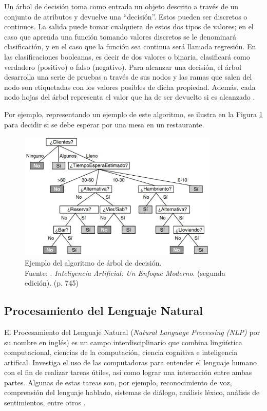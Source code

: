 \begin{itemize}
	Un árbol de decisión toma como entrada un objeto descrito a través de un conjunto de atributos y devuelve una “decisión”. Estos pueden ser discretos o continuos. La salida puede tomar cualquiera de estos dos tipos de valores; en el caso que aprenda una función tomando valores discretos se le denominará clasificación, y en el caso que la función sea continua será llamada regresión. En las clasificaciones booleanas, es decir de dos valores o binaria, clasificará como verdadero (positivo) o falso (negativo). Para alcanzar una decisión, el árbol desarrolla una serie de pruebas a través de sus nodos y las ramas que salen del nodo son etiquetadas con los valores posibles de dicha propiedad. Además, cada nodo hojas del árbol representa el valor que ha de ser devuelto si es alcanzado \parencite{bk_russell2004intart}.
	
	Por ejemplo, representando un ejemplo de este algoritmo, se ilustra en la Figura \ref{2:fig39} para decidir si se debe esperar por una mesa en un restaurante.
	\begin{figure}[h]
		\begin{center}
			\includegraphics[width=0.85\textwidth]{2/figures/arbol_decision.jpg}
			\caption[Ejemplo del algoritmo de árbol de decisión]{Ejemplo del algoritmo de árbol de decisión.\\
			Fuente: \cite{bk_russell2004intart}. \textit{Inteligencia Artificial: Un Enfoque Moderno}. (segunda edición). (p. 745)}
			\label{2:fig39}
		\end{center}
	\end{figure}
\end{itemize}

\clearpage
\subsection{Procesamiento del Lenguaje Natural}
El Procesamiento del Lenguaje Natural (\textit{Natural Language Processing (NLP)} por su nombre en inglés) es un campo interdisciplinario que combina lingüística computacional, ciencias de la computación, ciencia cognitiva e inteligencia artifical. Investiga el uso de las computadoras para entender el lenguaje humano con el fin de realizar tareas útiles, así como lograr una interacción entre ambas partes. Algunas de estas tareas son, por ejemplo, reconocimiento de voz, comprensión del lenguaje hablado, sistemas de diálogo, análisis léxico, análisis de sentimientos, entre otros \parencite{bk_deng2018deeplearningnlp}.

